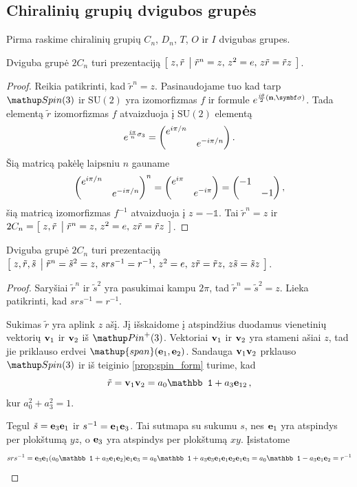 
\subsection{Chiralinių grupių dvigubos grupės}

Pirma raskime chiralinių grupių $C_n$, $D_n$, $T$, $O$ ir $I$ dvigubas grupes.

\begin{proposition}
	Dviguba grupė $2C_n$ turi prezentaciją $\left[\; z,\tilde r \;\left|\; \tilde r^n = z,\, z^2 = e,\, z\tilde r=\tilde rz \;\right.\right]$.
\end{proposition}
\begin{proof}
	Reikia patikrinti, kad $\tilde r^n = z$.
	Pasinaudojame tuo kad tarp $\spin$ ir $\mathup{SU}(2)$ yra izomorfizmas $f$ ir formule $e^{\frac{i\theta}{2}(\vb n, \symbf\sigma)}$.
	Tada elementą $\tilde r$ izomorfizmas $f$ atvaizduoja
	į $\mathup{SU}(2)$ elementą
	\begin{equation}
		e^{\frac{i\pi}{n}\sigma_3} = \mqty(\dmat{e^{i\pi/n},e^{-i\pi/n}})
		\,.
	\end{equation}
	Šią matricą pakėlę laipsniu $n$ gauname
	\begin{equation}
		\mqty(\dmat{e^{i\pi/n},e^{-i\pi/n}})^n = \mqty(\dmat{e^{i\pi},e^{-i\pi}}) = \mqty(\dmat{-1,-1})
		\,,
	\end{equation}
	šią matricą izomorfizmas $f^{-1}$ atvaizduoja į $z=-\mathbb1$.
	Tai $\tilde r^n = z$ ir $2C_n = \left[\; z,\tilde r \;\left|\; \tilde r^n = z,\, z^2 = e,\, z\tilde r=\tilde rz \;\right.\right]$.
\end{proof}

\begin{proposition}
	Dviguba grupė $2C_n$ turi prezentaciją
	$\left[\; z,\tilde r,\tilde s \;\left|\; 
		\tilde r^n = \tilde s^2 = z,\,
		srs^{-1}=r^{-1},\,
		z^2 = e,\,
		z\tilde r=\tilde rz,\,
		z\tilde s=\tilde sz
	 \;\right.\right]$.
\end{proposition}
\begin{proof}
	Saryšiai $\tilde r^n$ ir $\tilde s^2$ yra pasukimai kampu $2\pi$,
	tad $\tilde r^n = \tilde s^2 = z$.
	Lieka patikrinti, kad $srs^{-1}=r^{-1}$.
	
	Sukimas $\tilde r$ yra aplink $z$ ašį.
	Jį išskaidome į atspindžius duodamus vienetinių vektorių $\vb v_1$ ir $\vb v_2$ iš $\pinp$.
	Vektoriai $\vb v_1$ ir $\vb v_2$ yra stameni ašiai $z$,
	tad jie priklauso erdvei $\mathup{span}(\vb e_1,\vb e_2)$.
	Sandauga $\vb v_1 \vb v_2$ prklauso $\spin$ ir iš teiginio \ref{prop;spin_form} turime, kad
	\begin{equation}
		\tilde r = \vb v_1 \vb v_2 = a_0 \mathbb1 + a_3 \vb e_{12}
		\,,
	\end{equation}
	kur $a_0^2 + a_3^2 = 1$.

	Tegul $\tilde s = \vb e_3 \vb e_1$ ir $s^{-1}= \vb e_1 \vb e_3$.
	Tai sutmapa su sukumu $s$, nes $\vb e_1$ yra atspindys per plokštumą $yz$, o $\vb e_3$ yra atspindys per plokštumą $xy$.
	Įsistatome
	\begin{equation}
		srs^{-1} = \vb e_3 \vb e_1 (a_0\mathbb1 + a_3 \vb e_1 \vb e_2)\vb e_1 \vb e_3
		= a_0\mathbb1 + a_3 \vb e_3 \vb e_1 \vb e_1 \vb e_2\vb e_1 \vb e_3
		= a_0\mathbb1 - a_3 \vb e_1\vb e_2	
		= r^{-1}
	\end{equation}
\end{proof}

